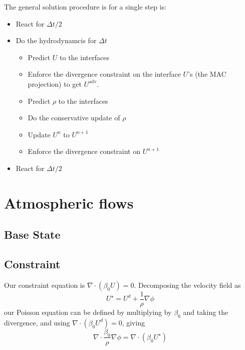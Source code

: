 The general solution procedure is for a single step is:
\begin{itemize}

  \item React for $\Delta t/2$

  \item Do the hydrodynamcis for $\Delta t$

    \begin{itemize}
    \item Predict $U$ to the interfaces 
    \item Enforce the divergence constraint on the interface $U$'s (the
      MAC projection) to get $U^\mathrm{adv}$.
    \item Predict $\rho$ to the interfaces
    \item Do the conservative update of $\rho$
    \item Update $U^n$ to $U^{n+1}$
    \item Enforce the divergence constraint on $U^{n+1}$
    \end{itemize}

  \item React for $\Delta t/2$

\end{itemize}

\section{Atmospheric flows}

\subsection{Base State}


\subsection{Constraint}

Our constraint equation is $\nabla \cdot (\beta_0 U) = 0$.
Decomposing the velocity field as
\begin{equation}
U^\star = U^d + \frac{1}{\rho} \nabla \phi
\end{equation}
our Poisson equation can be defined by multiplying by $\beta_0$ and
taking the divergence, and using $\nabla \cdot (\beta_0 U^d) = 0$, giving
\begin{equation}
\nabla \cdot \frac{\beta_0}{\rho} \nabla \phi = \nabla \cdot (\beta_0 U^\star)
\end{equation}
